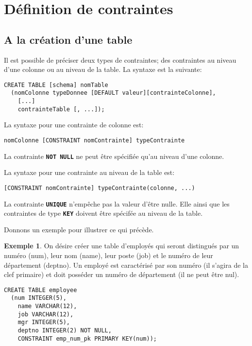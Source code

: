 \documentclass[a4paper, 12pt]{report}
\newcommand{\textSQL}[1]{\texttt{\textbf{#1}}}
\theoremstyle{definition} \newtheorem{ex}{Exemple}
\begin{document}
\section{Définition de contraintes}
\subsection{A la création d'une table}
Il est possible de préciser deux types de contraintes; des contraintes au niveau d'une colonne ou au niveau de la table. La syntaxe est la suivante:
\begin{lstlisting}[frame=single]
CREATE TABLE [schema] nomTable
  (nomColonne typeDonnee [DEFAULT valeur][contrainteColonne],
	[...]
	contrainteTable [, ...]);
\end{lstlisting}
La syntaxe pour une contrainte de colonne est:
\begin{lstlisting}[frame=single]
nomColonne [CONSTRAINT nomContrainte] typeContrainte
\end{lstlisting}
La contrainte \textSQL{NOT NULL} ne peut être spécifiée qu'au niveau d'une colonne.

La syntaxe pour une contrainte au niveau de la table est:
\begin{lstlisting}[frame=single]
[CONSTRAINT nomContrainte] typeContrainte(colonne, ...)
\end{lstlisting}
La contrainte \textSQL{UNIQUE} n'empêche pas la valeur d'être nulle. Elle ainsi que les contraintes de type \textSQL{KEY} doivent être spécifée au niveau de la table.

Donnons un exemple pour illustrer ce qui précède.
\begin{ex} \label{ex:constraints}
On désire créer une table d'employés qui seront distingués par un numéro (num), leur nom (name), leur poste (job) et le numéro de leur département (deptno). Un employé est caractérisé par son numéro (il s'agira de la clef primaire) et doit posséder un numéro de département (il ne peut être nul).
\begin{lstlisting}[frame=single]
CREATE TABLE employee
  (num INTEGER(5),
	name VARCHAR(12),
	job VARCHAR(12),
	mgr INTEGER(5),
	deptno INTEGER(2) NOT NULL,
	CONSTRAINT emp_num_pk PRIMARY KEY(num));
\end{lstlisting}
\end{ex}
\end{document}
